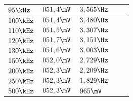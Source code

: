 \begin{table}[]
\begin{tabular}{l||l|l||l|l|}
\multicolumn{1}{|l|}{$95\kHz$}                      &$ 051,4\mV     $&$ 3,565\Hz       $&$             $&$              $\\ \hline
\multicolumn{1}{|l|}{$100\kHz$}                     &$ 051,4\mV     $&$ 3,480\Hz       $&$             $&$              $\\ \hline
\multicolumn{1}{|l|}{$110\kHz$}                     &$ 051,5\mV     $&$ 3,307\Hz       $&$             $&$              $\\ \hline
\multicolumn{1}{|l|}{$120\kHz$}                     &$ 051,7\mV     $&$ 3,151\Hz       $&$             $&$              $\\ \hline
\multicolumn{1}{|l|}{$130\kHz$}                     &$ 051,6\mV     $&$ 3,003\Hz       $&$             $&$              $\\ \hline
\multicolumn{1}{|l|}{$150\kHz$}                     &$ 052,0\mV     $&$ 2,729\Hz       $&$             $&$              $\\ \hline
\multicolumn{1}{|l|}{$200\kHz$}                     &$ 052,3\mV     $&$ 2,209\Hz       $&$             $&$              $\\ \hline
\multicolumn{1}{|l|}{$250\kHz$}                     &$ 052,3\mV     $&$ 1,829\Hz       $&$             $&$              $\\ \hline
\multicolumn{1}{|l|}{$500\kHz$}                     &$ 052,3\mV     $&$ 965\mV      $&$             $&$              $\\ \hline
\end{tabular}
\end{table}